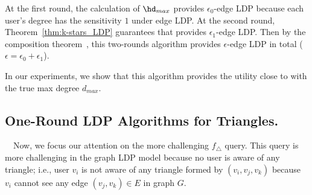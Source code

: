 
At the first round, the calculation of $\hd_{max}$  provides $\epsilon_0$-edge LDP because each user's degree has the sensitivity $1$ under edge LDP. 
At the second round, Theorem~\ref{thm:k-stars_LDP} guarantees that 
 provides $\epsilon_1$-edge LDP. 
Then by the composition theorem~\cite{DP}, this two-rounds algorithm provides $\epsilon$-edge LDP in total ($\epsilon =\epsilon_0 + \epsilon_1$). 

In our experiments, we show that this algorithm provides the utility close to  with the true max degree $d_{max}$. 

\subsection{One-Round LDP Algorithms for Triangles.}
\label{sub:non-interactive_triangles}
~~Now, we focus our attention on the more challenging $f_\triangle$ query. This
query is more challenging in the graph LDP model because no user is aware of any
triangle; i.e., user $v_i$ is not aware of any triangle formed by $(v_i, v_j, v_k)$ because $v_i$ cannot see any edge $(v_j, v_k) \in E$ in graph $G$. 

